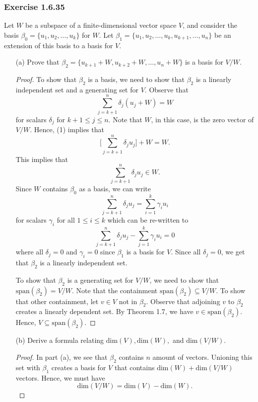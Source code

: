 \subsubsection{Exercise 1.6.35} Let \( W  \) be a subspace of a finite-dimensional vector space \( V  \), and consider the basis \( \beta_{0} =  \{ u_{1}, u_{2}, \dots, u_{k } \}   \) for \( W  \). Let \( \beta_{1} = \{ u_{1}, u_{2}, \dots, u_{k }, u_{k+1}, \dots, u_{n} \}  \) be an extension of this basis to a basis for \( V  \).
\begin{enumerate}
    \item[(a)] Prove that \( \beta_{2} = \{ u_{k+1} + W , u_{k+2} + W, \dots, u_{n} + W  \}  \) is a basis for \( V / W  \).
        \begin{proof}
            To show that \( \beta_{2}  \) is a basis, we need to show that \( \beta_{2} \) is a linearly independent set and a generating set for \( V  \). Observe that 
            \[  \sum_{ j=k+1 }^{ n } \delta_{j} (u_{j} + W) = W  \tag{1} \] 
             for scalars \( \delta_{j}  \) for \( k+1 \leq j \leq n  \). Note that \( W  \), in this case, is the zero vector of \( V / W  \). Hence, (1) implies that  
             \[ \Big[\sum_{ j=k+1 }^{ n  } \delta_{j} u_{j}  \Big] + W = W. \tag{2}      \]
            This implies that 
            \[  \sum_{ j=k+1 }^{ n } \delta_{j} u_{j} \in W. \tag{3}  \]
            Since \( W  \) contains \( \beta_{0}  \) as a basis, we can write
            \[  \sum_{ j=k+1 }^{ n } \delta_{j} u_{j} = \sum_{ i=1 }^{ k }\gamma_{i} u_{i} \]
            for scalars \( \gamma_{i}  \) for all \( 1 \leq i \leq k  \) which can be re-written to 
            \[ \sum_{ j=k+1 }^{ n } \delta_{j} u_{j} - \sum_{ j=1 }^{ k  }\gamma_{i} u_{i} = 0  \]
            where all \( \delta_{j} = 0  \) and \( \gamma_{i} = 0  \) since \( \beta_{1} \) is a basis for \( V  \). Since all \( \delta_{j} = 0 \), we get that \( \beta_{2}  \) is a linearly independent set. 

            To show that \( \beta_{2}  \) is a generating set for \( V / W  \), we need to show that \( \text{span}(\beta_{2}) = V / W  \). Note that the containment \( \text{span}(\beta_{2}) \subseteq V / W  \). To show that other containment, let \( v \in V  \) not in \( \beta_{2} \). Observe that adjoining \( v  \) to \( \beta_{2} \) creates a linearly dependent set. By Theorem 1.7, we have \( v \in \text{span}(\beta_{2}) \). Hence, \( V \subseteq \text{span}(\beta_{2}) \). 

        \end{proof}
    \item[(b)] Derive a formula relating \( \text{dim}(V), \text{dim}(W),  \) and \( \text{dim}(V / W ) \).
        \begin{proof}
            In part (a), we see that \( \beta_{2} \) contains \( n \) amount of vectors. Unioning this set with \( \beta_{1}   \) creates a basis for \( V  \) that contains \( \text{dim}(W) + \text{dim}(V/W) \) vectors. Hence, we must have 
            \[  \text{dim}(V/W) = \text{dim}(V) - \text{dim}(W). \]
        \end{proof}
\end{enumerate}

